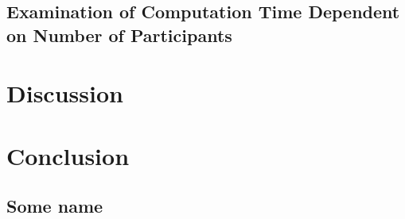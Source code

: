 	\section{Examination of Computation Time Dependent on Number of Participants}
	
		

\chapter{Discussion  }

\chapter{Conclusion }

\clearpage
\renewcommand{\bibname}{References} %
\printbibliography[heading=bibintoc] %

\begin{appendices}
	\chapter{Some name}
	\lipsum[3]
\end{appendices}

